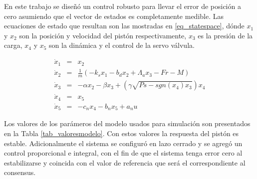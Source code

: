 En este trabajo se diseñó un control robusto para llevar el error de posición a cero asumiendo que el vector de estados es completamente medible. Las ecuaciones de estado que resultan son las mostradas en \ref{eq_statespace}, dónde $x_1$ y $x_2$ son la posición y velocidad del pistón respectivamente, $x_3$ es la presión de la carga, $x_4$ y $x_5$ son la dinámica y el control de la servo válvula.

\begin{eqnarray}
\label{eq_statespace}
\dot{x}_1&=&x_2\\
\nonumber \dot{x}_2&=&\frac{1}{m}(-k_sx_1-b_dx_2+\Lambda_ax_3-Fr-M)\\ 
\nonumber \dot{x}_3&=&-\alpha x_2-\beta x_3+(\gamma \sqrt{Ps-sgn(x_4)x_3})x_4\\
\nonumber \dot{x}_4&=&x_5\\
\nonumber \dot{x}_5&=&-c_nx_4-b_nx_5+a_nu
\end{eqnarray}

Los valores de los parámeros del modelo usados para simulación son presentados en la Tabla \ref{tab_valoresmodelo}. Con estos valores la respuesta del pistón es estable. Adicionalmente el sistema se configuró en lazo cerrado  y se agregó un control proporcional e integral, con el fin de que el sistema tenga error cero al estabilizarse y coincida con el valor de referencia que será el correspondiente al consensus.









